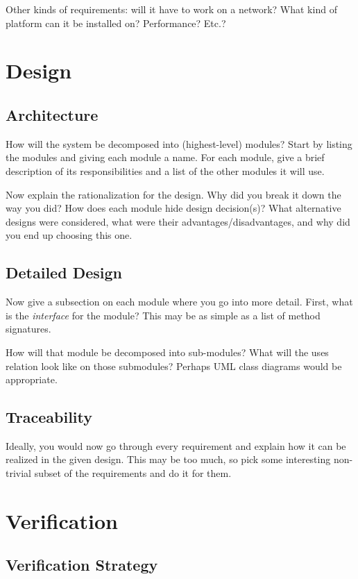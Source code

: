 \documentclass[11pt]{report}
\begin{document}
Other kinds of requirements: will it have to work on a network?  What
kind of platform can it be installed on?  Performance? Etc.?

\chapter{Design}

\section{Architecture}

How will the system be decomposed into (highest-level) modules?  Start
by listing the modules and giving each module a name.  For each
module, give a brief description of its responsibilities and a list of
the other modules it will use.

Now explain the rationalization for the design.  Why did you break it
down the way you did?  How does each module hide design decision(s)?
What alternative designs were considered, what were their
advantages/disadvantages, and why did you end up choosing this one.



\section{Detailed Design}

Now give a subsection on each module where you go into more detail.
First, what is the \emph{interface} for the module? This may be as
simple as a list of method signatures.

How will that module be decomposed into sub-modules?  What will the
uses relation look like on those submodules?  Perhaps UML class
diagrams would be appropriate.

\section{Traceability}

Ideally, you would now go through every requirement and explain
how it can be realized in the given design.  This may be too much,
so pick some interesting non-trivial subset of the requirements
and do it for them.

\chapter{Verification}

\section{Verification Strategy}
\end{document}
